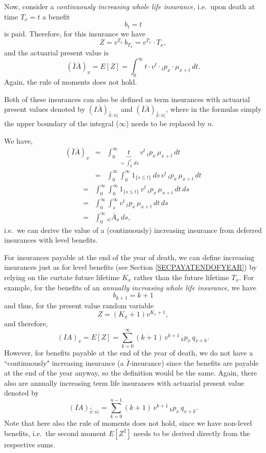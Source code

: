 \documentclass[11pt,fleqn,oneside]{book}
\begin{document}
Now, consider a \textit{continuously increasing whole life insurance}, i.e.\ upon death at time $T_x=t$ a benefit
$$
b_t = t
$$
is paid. Therefore, for this insurance we have
$$
Z = v^{T_x}\,b_{T_x} = v^{T_x}\cdot T_x,
$$
and the actuarial present value is
$$
\left(\bar{I}\bar{A}\right)_x = E[Z] = \int_0^{\infty} t \cdot v^t \cdot {_tp_x}\cdot \mu_{x+t}\,dt. 
$$
Again, the rule of moments does not hold.

Both of these insurances can also be defined as term insurances with actuarial present values denoted by $\left(I \bar{A}\right)_{\stackrel{1}{x}:\overline{n}|}$ and $\left(\bar{I} \bar{A}\right)_{\stackrel{1}{x}:\overline{n}|}$, where in the formulas simply the upper boundary of the integral ($\infty$) needs to be replaced by $n$.

We have,
\begin{eqnarray*}
\left(\bar{I}\bar{A}\right)_x &=& \int_0^{\infty} \underbrace{t}_{=\int_0^t \,ds}\,v^t \,{_tp_x}\,\mu_{x+t}\,dt\\
&=& \int_0^{\infty} \int_0^{\infty} 1_{\{s \leq t\}} \,ds\,v^t \,{_tp_x}\,\mu_{x+t}\,dt
\end{eqnarray*}
\begin{eqnarray*}
&=& \int_0^{\infty} \int_0^{\infty} 1_{\{s \leq t\}} \,v^t \,{_tp_x}\,\mu_{x+t}\,dt\,ds\\
&=& \int_0^{\infty} \int_s^{\infty} v^t \,{_tp_x}\,\mu_{x+t}\,dt\,ds\\
&=& \int_0^{\infty} {_{s|}\bar{A}_x}\,ds,
\end{eqnarray*}
i.e.\ we can derive the value of a (continuously) increasing insurance from deferred insurances with level benefits.

For insurances payable at the end of the year of death, we can define increasing insurances just as for level benefits (see Section \ref{SECPAYATENDOFYEAR}) by relying on the curtate future lifetime $K_x$ rather than the future lifetime $T_x$. For example, for the benefits of an \textit{annually increasing whole life insurance}, we have
$$
b_{k+1} = k+1
$$
and thus, for the present value random variable
$$
Z = \left(K_x+1\right)v^{K_x+1},
$$
and therefore,
$$
\left(IA\right)_x = E[Z] = \sum_{k=0}^{\infty} (k+1)\,v^{k+1}\,{_kp_x}\,{q_{x+k}}.
$$
However, for benefits payable at the end of the year of death, we do not have a ``continuously" increasing insurance (a $\bar{I}$-insurance) since the benefits are payable at the end of the year anyway, so the definition would be the same. Again, there also are annually increasing term life insurances with actuarial present value denoted by 
$$
{\left(IA\right)_{\stackrel{1}{x}:\overline{n}|}} = \sum_{k=0}^{n-1} (k+1)\,v^{k+1}\,{_kp_x}\,{q_{x+k}}.
$$ 
Note that here also the rule of moments does not hold, since we have non-level benefits, i.e.\ the second moment $E[Z^2]$ needs to be derived directly from the respective sums.
\end{document}
